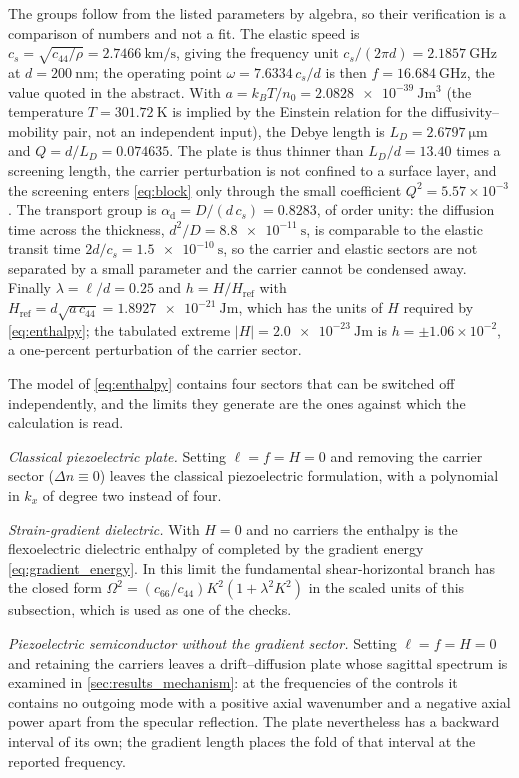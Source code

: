The groups follow from the listed parameters by algebra, so their verification is a comparison of numbers and not a fit.  The elastic speed is
$c_s=\sqrt{c_{44}/\rho}=\SI{2.7466}{\kilo\metre\per\second}$, giving the frequency unit
$c_s/(2\pi d)=\SI{2.1857}{\giga\hertz}$ at $d=\SI{200}{\nano\metre}$; the operating point
$\omega=7.6334\,c_s/d$ is then $f=\SI{16.684}{\giga\hertz}$, the value quoted in the abstract.
With $a=k_BT/n_0=\SI{2.0828e-39}{\joule\metre^{3}}$ (the temperature
$T=\SI{301.72}{\kelvin}$ is implied by the Einstein relation for the diffusivity--mobility
pair, not an independent input), the Debye length is
$L_D=\SI{2.6797}{\micro\metre}$ and $Q=d/L_D=0.074635$.  The plate is thus thinner than
$L_D/d=13.40$ times a screening length, the carrier perturbation is not confined to a
surface layer, and the screening enters \eqref{eq:block} only through the small coefficient
$Q^{2}=5.57\times10^{-3}$.  The transport group is
$\alpha_{\mathrm d}=D/(d\,c_s)=0.8283$, of order unity: the diffusion time across the
thickness, $d^{2}/D=\SI{8.8e-11}{\second}$, is comparable to the elastic transit time
$2d/c_s=\SI{1.5e-10}{\second}$, so the carrier and elastic sectors are not separated by a
small parameter and the carrier cannot be condensed away.  Finally $\lambda=\ell/d=0.25$
and $h=H/H_{\mathrm{ref}}$ with
$H_{\mathrm{ref}}=d\sqrt{a\,c_{44}}=\SI{1.8927e-21}{\joule\metre}$, which has the units of $H$
required by \eqref{eq:enthalpy}; the tabulated extreme $|H|=\SI{2.0e-23}{\joule\metre}$ is
$h=\pm1.06\times10^{-2}$, a one-percent perturbation of the carrier sector.

The model of \eqref{eq:enthalpy} contains four sectors that can be switched off
independently, and the limits they generate are the ones against which the
calculation is read.

\emph{Classical piezoelectric plate.}  Setting $\ell=f=H=0$ and removing the
carrier sector ($\Delta n\equiv0$) leaves the classical piezoelectric
formulation, with a polynomial in $k_x$ of degree two instead of four.

\emph{Strain-gradient dielectric.}  With $H=0$ and no carriers the enthalpy is
the flexoelectric dielectric enthalpy of \cite{shen2010theory} completed by the
gradient energy \eqref{eq:gradient_energy}.  In this limit the fundamental
shear-horizontal branch has the closed form
$\Omega^{2}=(c_{66}/c_{44})K^{2}(1+\lambda^{2}K^{2})$ in the scaled units of this subsection, which is used as one of the checks.

\emph{Piezoelectric semiconductor without the gradient sector.}  Setting
$\ell=f=H=0$ and retaining the carriers leaves a drift--diffusion plate whose
sagittal spectrum is examined in \cref{sec:results_mechanism}: at the frequencies of the controls it
contains no outgoing mode with a positive axial wavenumber and a negative axial
power apart from the specular reflection.  The plate nevertheless has a backward
interval of its own; the gradient length places the fold of that interval at the
reported frequency.

